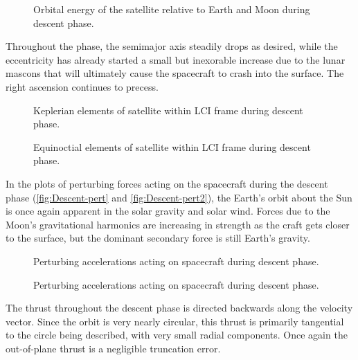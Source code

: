 \begin{figure}
\centering
\def\svgwidth{\figurewidth}

\caption{Orbital energy of the satellite relative to Earth and Moon during descent phase.}
\label{fig:Descent-orbeng}
\end{figure}

Throughout the phase, the semimajor axis steadily drops as desired, while the eccentricity has already started a small but inexorable increase due to the lunar mascons that will ultimately cause the spacecraft to crash into the surface. The right ascension continues to precess.

\begin{figure}
\centering
\def\svgwidth{\figurewidth}

\caption{Keplerian elements of satellite within LCI frame during descent phase.}
\label{fig:Descent-kep-lci}
\end{figure}

\begin{figure}
\centering
\def\svgwidth{\figurewidth}

\caption{Equinoctial elements of satellite within LCI frame during descent phase.}
\label{fig:Descent-mee}
\end{figure}

In the plots of perturbing forces acting on the spacecraft during the descent phase (\autoref{fig:Descent-pert} and \autoref{fig:Descent-pert2}), the Earth's orbit about the Sun is once again apparent in the solar gravity and solar wind. Forces due to the Moon's gravitational harmonics are increasing in strength as the craft gets closer to the surface, but the dominant secondary force is still Earth's gravity.

\begin{figure}
\centering
\def\svgwidth{\figurewidth}

\caption{Perturbing accelerations acting on spacecraft during descent phase.}
\label{fig:Descent-pert}
\end{figure}

\begin{figure}
\centering
\def\svgwidth{\figurewidth}

\caption{Perturbing accelerations acting on spacecraft during descent phase.}
\label{fig:Descent-pert2}
\end{figure}

The thrust throughout the descent phase is directed backwards along the velocity vector. Since the orbit is very nearly circular, this thrust is primarily tangential to the circle being described, with very small radial components. Once again the out-of-plane thrust is a negligible truncation error.

